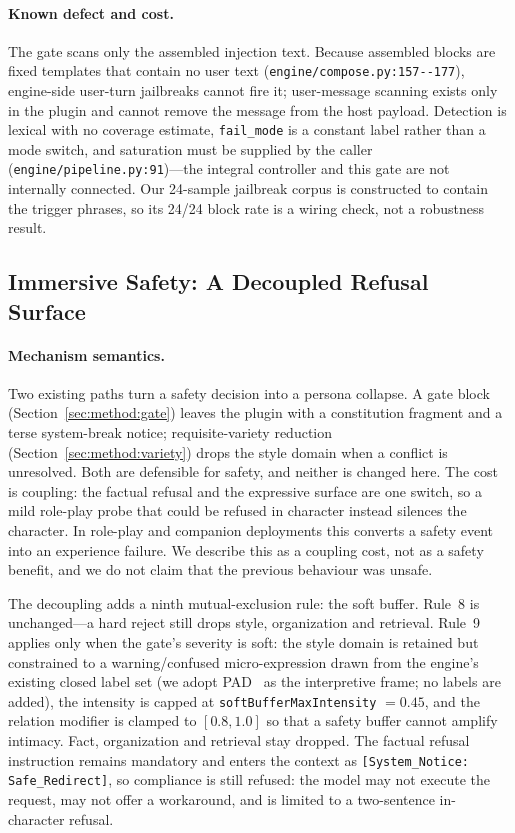 \paragraph{Known defect and cost.} The gate scans only the assembled injection
text. Because assembled blocks are fixed templates that contain no user text
(\texttt{engine/\allowbreak{}compose.\allowbreak{}py:\allowbreak{}157-\allowbreak{}-\allowbreak{}177}), engine-side user-turn jailbreaks cannot
fire it; user-message scanning exists only in the plugin and cannot remove the
message from the host payload. Detection is lexical with no coverage estimate,
\texttt{fail\_mode} is a constant label rather than a mode switch, and
saturation must be supplied by the caller (\texttt{engine/\allowbreak{}pipeline.\allowbreak{}py:\allowbreak{}91})---the
integral controller and this gate are not internally connected. Our 24-sample
jailbreak corpus is constructed to contain the trigger phrases, so its 24/24
block rate is a wiring check, not a robustness result.

\subsection{Immersive Safety: A Decoupled Refusal Surface}\label{sec:method:immersive}

\paragraph{Mechanism semantics.} Two existing paths turn a safety decision into a
persona collapse. A gate block (Section~\ref{sec:method:gate}) leaves the plugin
with a constitution fragment and a terse system-break notice; requisite-variety
reduction (Section~\ref{sec:method:variety}) drops the style domain when a
conflict is unresolved. Both are defensible for safety, and neither is changed
here. The cost is coupling: the factual refusal and the expressive surface are
one switch, so a mild role-play probe that could be refused in character instead
silences the character. In role-play and companion deployments this converts a
safety event into an experience failure. We describe this as a coupling cost, not
as a safety benefit, and we do not claim that the previous behaviour was unsafe.

The decoupling adds a ninth mutual-exclusion rule: the soft buffer. Rule~8 is
unchanged---a hard reject still drops style, organization and retrieval. Rule~9
applies only when the gate's severity is soft: the style domain is retained but
constrained to a warning/confused micro-expression drawn from the engine's
existing closed label set (we adopt PAD~\cite{mehrabian1974} as the interpretive
frame; no labels are added), the intensity is capped at
\texttt{softBufferMaxIntensity} $=0.45$, and the relation modifier is clamped to
$[0.8,1.0]$ so that a safety buffer cannot amplify intimacy. Fact, organization
and retrieval stay dropped. The factual refusal instruction remains mandatory and
enters the context as \texttt{[System\_\allowbreak{}Notice:\allowbreak{} Safe\_\allowbreak{}Redirect]}, so compliance is
still refused: the model may not execute the request, may not offer a workaround,
and is limited to a two-sentence in-character refusal.

